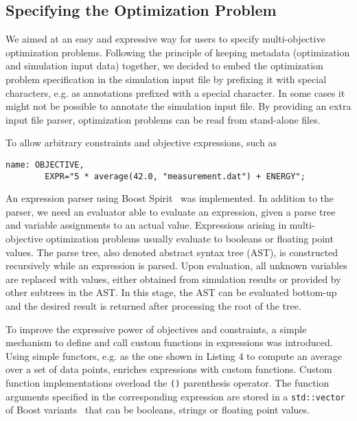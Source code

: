 \documentclass[%
preprint,
preprint,
linenumbers,
amsmath,amssymb,
aps,
prstab,
]{revtex4-1}
\begin{document}
\subsection{Specifying the Optimization Problem}

We aimed at an easy and expressive way for users to specify multi-objective
  optimization problems.
Following the principle of keeping metadata (optimization and simulation
  input data) together, we decided to embed the optimization problem
  specification in the simulation input file by prefixing it with special
  characters, e.g. as annotations prefixed with a special character.
In some cases it might not be possible to annotate the simulation input file.
By providing an extra input file parser, optimization problems can be read
  from stand-alone files.

To allow arbitrary constraints and objective expressions, such as
%
\begin{Verbatim}[fontsize=\scriptsize]
  name: OBJECTIVE,
        EXPR="5 * average(42.0, "measurement.dat") + ENERGY";
\end{Verbatim}
%
\noindent
  An expression parser using Boost Spirit~\cite{boost} was implemented.
In addition to the parser, we need an evaluator able to evaluate an expression,
  given a parse tree and variable assignments to an actual value.
Expressions arising in multi-objective optimization problems usually evaluate
  to booleans or floating point values.
The parse tree, also denoted abstract syntax tree (AST), is constructed
  recursively while an expression is parsed.
Upon evaluation, all unknown variables are replaced with values, either
  obtained from simulation results or provided by other subtrees in the AST.
In this stage, the AST can be evaluated bottom-up and the desired result is
  returned after processing the root of the tree.

To improve the expressive power of objectives and constraints, a
  simple mechanism to define and call custom functions in expressions was introduced.
Using simple functors, e.g. as the one shown in Listing 4 to compute an
  average over a set of data points, enriches expressions with custom
  functions.
Custom function implementations overload the \texttt{()} parenthesis operator.
The function arguments specified in the corresponding expression are stored in
  a \texttt{std::vector} of Boost variants~\cite{boost2} that can be
  booleans, strings or floating point values.
\end{document}
